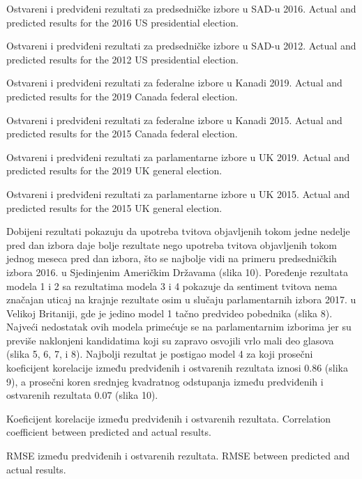     {Ostvareni i predviđeni rezultati za predsedničke izbore u SAD-u 2016.}
    {Actual and predicted results for the 2016 US presidential election.}

    {Ostvareni i predviđeni rezultati za predsedničke izbore u SAD-u 2012.}
    {Actual and predicted results for the 2012 US presidential election.}

    {Ostvareni i predviđeni rezultati za federalne izbore u Kanadi 2019.}
    {Actual and predicted results for the 2019 Canada federal election.}

    {Ostvareni i predviđeni rezultati za federalne izbore u Kanadi 2015.}
    {Actual and predicted results for the 2015 Canada federal election.}

    {Ostvareni i predviđeni rezultati za parlamentarne izbore u UK 2019.}
    {Actual and predicted results for the 2019 UK general election.}

    {Ostvareni i predviđeni rezultati za parlamentarne izbore u UK 2015.}
    {Actual and predicted results for the 2015 UK general election.}

Dobijeni rezultati pokazuju da upotreba tvitova objavljenih tokom jedne nedelje pred dan izbora daje bolje rezultate nego upotreba tvitova objavljenih tokom jednog meseca pred dan izbora, što se najbolje vidi na primeru predsedničkih izbora 2016. u Sjedinjenim Američkim Državama (slika 10). Poređenje rezultata modela 1 i 2 sa rezultatima modela 3 i 4 pokazuje da sentiment tvitova nema značajan uticaj na krajnje rezultate osim u slučaju parlamentarnih izbora 2017. u Velikoj Britaniji, gde je jedino model 1 tačno predvideo pobednika (slika 8). Najveći nedostatak ovih modela primećuje se na parlamentarnim izborima jer su previše naklonjeni kandidatima koji su zapravo osvojili vrlo mali deo glasova (slika 5, 6, 7, i 8). Najbolji rezultat je postigao model 4 za koji prosečni koeficijent korelacije između predviđenih i ostvarenih rezultata iznosi 0.86 (slika 9), a prosečni koren srednjeg kvadratnog odstupanja između predviđenih i ostvarenih rezultata 0.07 (slika 10). 


    {Koeficijent korelacije između predviđenih i ostvarenih rezultata.}
    {Correlation coefficient between predicted and actual results.}

    {RMSE između predviđenih i ostvarenih rezultata.}
    {RMSE between predicted and actual results.}

